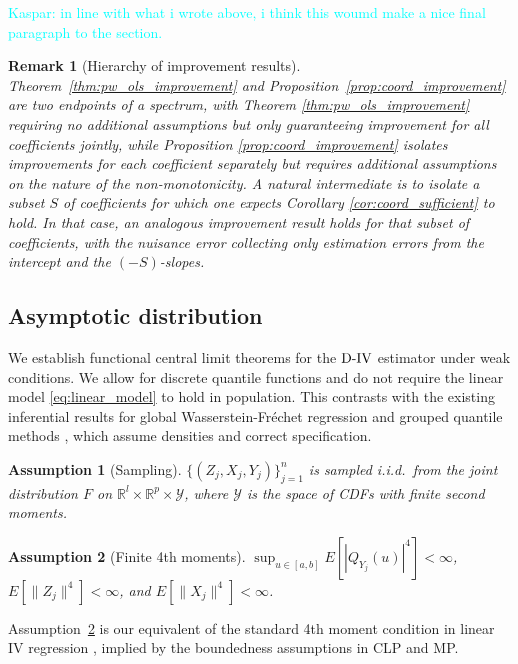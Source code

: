 \documentclass[12pt]{article}
\newcommand{\kw}[1]{\textcolor{cyan}{Kaspar: #1}}
\newcommand{\est}{\ensuremath{\textnormal{D-IV}}\xspace}
\newcommand{\CLP}{CLP\xspace}
\newcommand{\MP}{MP\xspace}
\newcommand{\R}{\mathbb{R}} %
\newcommand{\calP}{\mathcal{Y}} %
\newtheorem{assumption}{Assumption}
\newtheorem{remark}{Remark}
\begin{document}
\kw{in line with what i wrote above, i think this woumd make a nice final paragraph to the section.}
\begin{remark}[Hierarchy of improvement results]\label{rem:hierarchy}
Theorem~\ref{thm:pw_ols_improvement} and Proposition~\ref{prop:coord_improvement} are two endpoints of a spectrum, with Theorem \ref{thm:pw_ols_improvement} requiring no additional assumptions but only guaranteeing improvement for all coefficients jointly, while Proposition \ref{prop:coord_improvement} isolates improvements for each coefficient separately but requires additional assumptions on the nature of the non-monotonicity. A natural intermediate is to isolate a subset $S$ of coefficients for which one expects Corollary \ref{cor:coord_sufficient} to hold. In that case, an analogous improvement result holds for that subset of coefficients, with the nuisance error collecting only estimation errors from the intercept and the $(-S)$-slopes.


\end{remark}

\subsection{Asymptotic distribution}\label{sec:asymptotic_distribution}

We establish functional central limit theorems for the \est estimator under weak conditions. We allow for discrete quantile functions and do not require the linear model \eqref{eq:linear_model} to hold in population. This contrasts with the existing inferential results for global Wasserstein-Fr\'echet regression \citep{petersen2021wasserstein} and grouped quantile methods \citep[e.g.,][]{chetverikov2016iv,melly2025minimum}, which assume densities and correct specification.

\begin{assumption}[Sampling] \label{asspt:sampling}
$\{(Z_j, X_j, Y_j)\}_{j=1}^n$ is sampled i.i.d.\ from the joint distribution $F$ on $\R^l \times \R^p \times \calP$, where $\calP$ is the space of CDFs with finite second moments.
\end{assumption}

\begin{assumption}[Finite 4th moments] \label{asspt:finite_moments}
$\sup_{u \in [a,b]} E[|Q_{Y_j}(u)|^{4}] < \infty $, $E[\|Z_j\|^{4}] < \infty$, and $E[\|X_j\|^{4}] < \infty$.
\end{assumption}

Assumption~\ref{asspt:finite_moments} is our equivalent of the standard 4th moment condition in linear IV regression \citep[e.g.,][]{hansen2022econometrics}, implied by the boundedness assumptions in \CLP and \MP.
\end{document}
